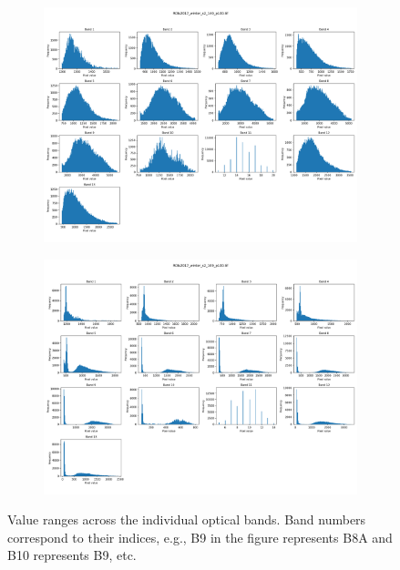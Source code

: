 \begin{figure}[h!]
    \vspace{0.5em}
    \begin{subfigure}{0.49\textwidth}
        \centering
        \includegraphics[width=\linewidth]{img/data_ranges/sample_3.png}
        \label{fig:sub3}
    \end{subfigure}
    \hfill
    \begin{subfigure}{0.49\textwidth}
        \centering
        \includegraphics[width=\linewidth]{img/data_ranges/sample_4.png}
        \label{fig:sub4}
    \end{subfigure}

    \caption{Value ranges across the individual optical bands. Band numbers correspond to their indices, e.g., B9 in the figure represents B8A and B10 represents B9, etc.}

    \label{fig:data_ranges}
\end{figure}

